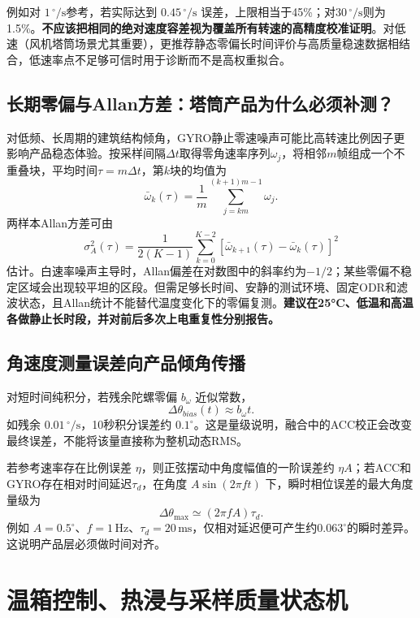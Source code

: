 \documentclass[UTF8,a4paper,11pt,oneside,openany,fontset=none]{ctexbook}
\newcommand{\dps}{\,^{\circ}/\mathrm s}
\begin{document}
例如对 $1\dps$参考，若实际达到 $0.45\dps$ 误差，上限相当于45\%；对$30\dps$则为1.5\%。\textbf{不应该把相同的绝对速度容差视为覆盖所有转速的高精度校准证明}。对低速（风机塔筒场景尤其重要），更推荐静态零偏长时间评价与高质量稳速数据相结合，低速率点不足够可信时用于诊断而不是高权重拟合。

\section{长期零偏与Allan方差：塔筒产品为什么必须补测？}
对低频、长周期的建筑结构倾角，GYRO静止零速噪声可能比高转速比例因子更影响产品稳态体验。按采样间隔$\Delta t$取得零角速率序列$\omega_j$，将相邻$m$帧组成一个不重叠块，平均时间$\tau=m\Delta t$，第$k$块的均值为
\begin{equation}
\bar\omega_k(\tau)=\frac1m\sum_{j=km}^{(k+1)m-1}\omega_j.
\end{equation}
两样本Allan方差可由
\begin{equation}
\sigma_A^2(\tau)=\frac1{2(K-1)}\sum_{k=0}^{K-2}\left[\bar\omega_{k+1}(\tau)-\bar\omega_k(\tau)\right]^2
\end{equation}
估计。白速率噪声主导时，Allan偏差在对数图中的斜率约为$-1/2$；某些零偏不稳定区域会出现较平坦的区段。但需足够长时间、安静的测试环境、固定ODR和滤波状态，且Allan统计不能替代温度变化下的零偏复测。\textbf{建议在25°C、低温和高温各做静止长时段，并对前后多次上电重复性分别报告。}

\section{角速度测量误差向产品倾角传播}
对短时间纯积分，若残余陀螺零偏 $b_\omega$ 近似常数，
\begin{equation}\Delta\theta_{bias}(t)\approx b_\omega t.
\end{equation}
如残余 $0.01\dps$，10秒积分误差约 $0.1^\circ$。这是量级说明，融合中的ACC校正会改变最终误差，不能将该量直接称为整机动态RMS。

若参考速率存在比例误差 $\eta$，则正弦摆动中角度幅值的一阶误差约 $\eta A$；若ACC和GYRO存在相对时间延迟$\tau_d$，在角度 $A\sin(2\pi ft)$ 下，瞬时相位误差的最大角度量级为
\begin{equation}\Delta\theta_{\max}\simeq (2\pi f A)\tau_d.
\end{equation}
例如 $A=0.5^\circ$、$f=1\,\mathrm{Hz}$、$\tau_d=20\,\mathrm{ms}$，仅相对延迟便可产生约$0.063^\circ$的瞬时差异。这说明产品层必须做时间对齐。

\chapter{温箱控制、热浸与采样质量状态机}
\end{document}
